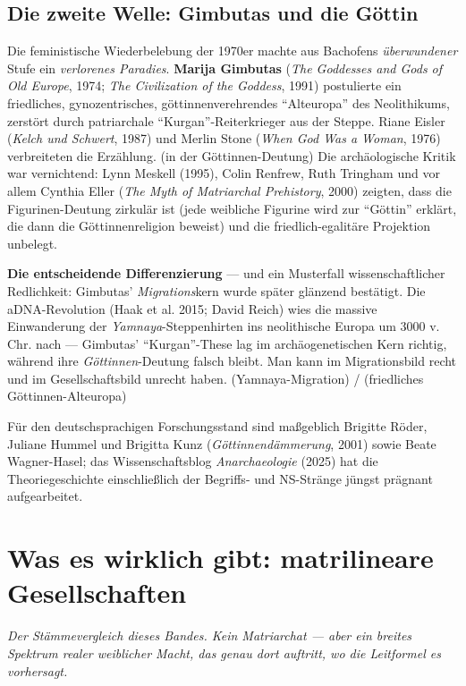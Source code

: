 \documentclass[11pt,a4paper,ngerman]{scrartcl}
\newcommand{\chipbase}[2]{\hspace{0pt}{\footnotesize\textcolor{#1}{[\textsc{#2}]}}}
\newcommand{\chipbelegt}[1]{\chipbase{chipgreen}{#1}}
\newcommand{\chipthese}[1]{\chipbase{chipblue}{#1}}
\begin{document}
\subsection*{Die zweite Welle: Gimbutas und die Göttin}
Die feministische Wiederbelebung der 1970er machte aus Bachofens \emph{überwundener} Stufe ein \emph{verlorenes Paradies}. \textbf{Marija Gimbutas} (\emph{The Goddesses and Gods of Old Europe}, 1974; \emph{The Civilization of the Goddess}, 1991) postulierte ein friedliches, gynozentrisches, göttinnenverehrendes \enquote{Alteuropa} des Neolithikums, zerstört durch patriarchale \enquote{Kurgan}-Reiterkrieger aus der Steppe. Riane Eisler (\emph{Kelch und Schwert}, 1987) und Merlin Stone (\emph{When God Was a Woman}, 1976) verbreiteten die Erzählung. \chipthese{widerlegt} (in der Göttinnen-Deutung) Die archäologische Kritik war vernichtend: Lynn Meskell (1995), Colin Renfrew, Ruth Tringham und vor allem Cynthia Eller (\emph{The Myth of Matriarchal Prehistory}, 2000) zeigten, dass die Figurinen-Deutung zirkulär ist (jede weibliche Figurine wird zur \enquote{Göttin} erklärt, die dann die Göttinnenreligion beweist) und die friedlich-egalitäre Projektion unbelegt.

\textbf{Die entscheidende Differenzierung} --- und ein Musterfall wissenschaftlicher Redlichkeit: Gimbutas' \emph{Migrations}kern wurde später glänzend bestätigt. Die aDNA-Revolution (Haak et al. 2015; David Reich) wies die massive Einwanderung der \emph{Yamnaya}-Steppenhirten ins neolithische Europa um 3000 v.\,Chr. nach --- Gimbutas' \enquote{Kurgan}-These lag im archäogenetischen Kern richtig, während ihre \emph{Göttinnen}-Deutung falsch bleibt. Man kann im Migrationsbild recht und im Gesellschaftsbild unrecht haben. \chipbelegt{belegt} (Yamnaya-Migration) / \chipthese{widerlegt} (friedliches Göttinnen-Alteuropa)

Für den deutschsprachigen Forschungsstand sind maßgeblich Brigitte Röder, Juliane Hummel und Brigitta Kunz (\emph{Göttinnendämmerung}, 2001) sowie Beate Wagner-Hasel; das Wissenschaftsblog \emph{Anarchaeologie} (2025) hat die Theoriegeschichte einschließlich der Begriffs- und NS-Stränge jüngst prägnant aufgearbeitet. \chipbelegt{belegt}
\section{Was es wirklich gibt: matrilineare Gesellschaften}
\noindent\textit{Der Stämmevergleich dieses Bandes. Kein Matriarchat --- aber ein breites Spektrum realer weiblicher Macht, das genau dort auftritt, wo die Leitformel es vorhersagt.}
\medskip
\end{document}

